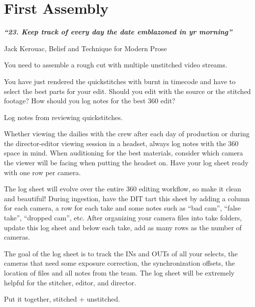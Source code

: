 \chapter{First Assembly}
\pagecolor{white}
\label{chap:31}
\begin{fullwidth}

{\itshape\bfseries “23. Keep track of every day the date emblazoned in yr morning”}

Jack Kerouac, Belief and Technique for Modern Prose
\vspace{\baselineskip}

\problem

{\large You need to assemble a rough cut with multiple unstitched video streams. \par}

You have just rendered the quickstitches with burnt in timecode and have to select the best parts for your edit. Should you edit with the source or the stitched footage? How should you log notes for the best 360 edit?  

\solution

{\large Log notes from reviewing quickstitches. \par}

Whether viewing the dailies with the crew after each day of production or during the director-editor viewing session in a headset, always log notes with the 360 space in mind. When auditioning for the best materials, consider which camera the viewer will be facing when putting the  headset on. Have your log sheet ready with one row per camera. 


The log sheet will evolve over the entire 360 editing workflow, so make it clean and beautiful! During ingestion, have the DIT tart this sheet by adding a column for each camera, a row for each take and some notes such as “bad cam”, “false take”, “dropped cam”, etc. After organizing your camera files into take folders, update this log sheet and below each take, add as many rows as the number of cameras.


The goal of the log sheet is to track the INs and OUTs of all your selects, the cameras that need some exposure correction, the synchronization offsets, the location of files and all notes from the team. The log sheet will be extremely helpful for the stitcher, editor, and director.

{\large Put it together, stitched + unstitched. \par}


\end{fullwidth}
